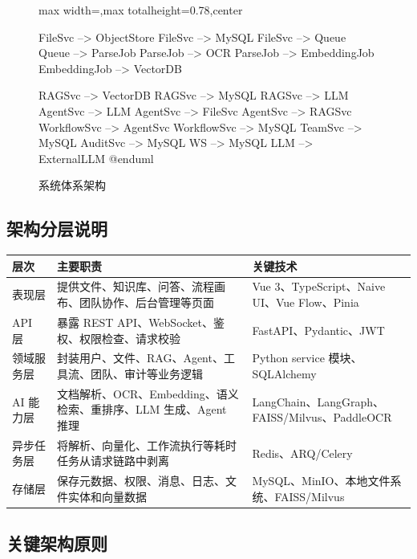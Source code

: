 \documentclass[a4paper,zihao=-4]{ctexart}
\begin{document}
\begin{figure}[H]
\begin{adjustbox}{max width=\linewidth,max totalheight=0.78\textheight,center}
\begin{plantuml}
FileSvc --> ObjectStore
FileSvc --> MySQL
FileSvc --> Queue
Queue --> ParseJob
ParseJob --> OCR
ParseJob --> EmbeddingJob
EmbeddingJob --> VectorDB

RAGSvc --> VectorDB
RAGSvc --> MySQL
RAGSvc --> LLM
AgentSvc --> LLM
AgentSvc --> FileSvc
AgentSvc --> RAGSvc
WorkflowSvc --> AgentSvc
WorkflowSvc --> MySQL
TeamSvc --> MySQL
AuditSvc --> MySQL
WS --> MySQL
LLM --> ExternalLLM
@enduml
\end{plantuml}
\endgroup
\end{adjustbox}
\caption{系统体系架构}
\end{figure}

\hypertarget{ux67b6ux6784ux5206ux5c42ux8bf4ux660e}{%
\subsection{架构分层说明}\label{ux67b6ux6784ux5206ux5c42ux8bf4ux660e}}

\begin{longtable}{|>{\raggedright\arraybackslash}p{2.4cm}|>{\raggedright\arraybackslash}p{\dimexpr(\linewidth-2.4cm-6\tabcolsep-4\arrayrulewidth)/2\relax}|>{\raggedright\arraybackslash}p{\dimexpr(\linewidth-2.4cm-6\tabcolsep-4\arrayrulewidth)/2\relax}|}
\hline
层次 & 主要职责 & 关键技术\tabularnewline
\hline
\endhead
表现层 & 提供文件、知识库、问答、流程画布、团队协作、后台管理等页面 & Vue 3、TypeScript、Naive UI、Vue Flow、Pinia\tabularnewline
\hline
API 层 & 暴露 REST API、WebSocket、鉴权、权限检查、请求校验 & FastAPI、Pydantic、JWT\tabularnewline
\hline
领域服务层 & 封装用户、文件、RAG、Agent、工具流、团队、审计等业务逻辑 & Python service 模块、SQLAlchemy\tabularnewline
\hline
AI 能力层 & 文档解析、OCR、Embedding、语义检索、重排序、LLM 生成、Agent 推理 & LangChain、LangGraph、FAISS/Milvus、PaddleOCR\tabularnewline
\hline
异步任务层 & 将解析、向量化、工作流执行等耗时任务从请求链路中剥离 & Redis、ARQ/Celery\tabularnewline
\hline
存储层 & 保存元数据、权限、消息、日志、文件实体和向量数据 & MySQL、MinIO、本地文件系统、FAISS/Milvus\tabularnewline
\hline
\end{longtable}

\hypertarget{ux5173ux952eux67b6ux6784ux539fux5219}{%
\subsection{关键架构原则}\label{ux5173ux952eux67b6ux6784ux539fux5219}}
\end{document}
